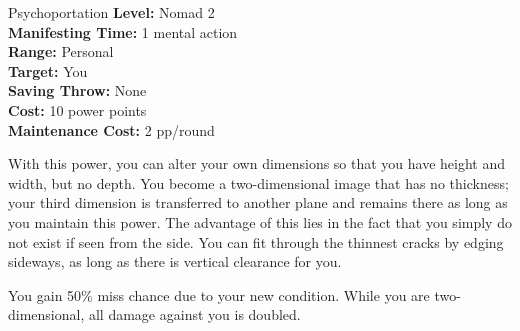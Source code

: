 {Psychoportation}
{
	\textbf{Level:}
	Nomad 2\\
	\textbf{Manifesting Time:}
	1 mental action\\
	\textbf{Range:}
	Personal\\
	\textbf{Target:}
	You\\
	\textbf{Saving Throw:}
	None\\
	\textbf{Cost:}
	10 power points\\
	\textbf{Maintenance Cost:}
	2 pp/round\\
}
{
	With this power, you can alter your own dimensions so that you have height and width, but no depth. You become a two-dimensional image that has no thickness; your third dimension is transferred to another plane and remains there as long as you maintain this power. The advantage of this lies in the fact that you simply do not exist if seen from the side. You can fit through the thinnest cracks by edging sideways, as long as there is vertical clearance for you.

	You gain 50\% miss chance due to your new condition. While you are two-dimensional, all damage against you is doubled.
}